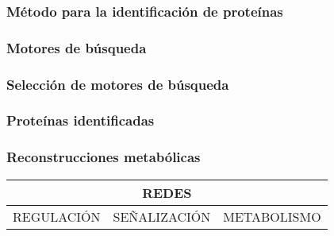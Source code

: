 \documentclass[10pt]{beamer}
\begin{document}
\begin{frame}
\frametitle{Método para la identificación de proteínas}
\end{frame}
\begin{frame}
\frametitle{Motores de búsqueda}
\end{frame}
\begin{frame}
\frametitle{Selección de motores de búsqueda}
\end{frame}
\begin{frame}
\frametitle{Proteínas identificadas}
\end{frame}
\begin{frame}
\frametitle{Reconstrucciones metabólicas}
\begin{center}
\begin{tabular}{|c|c|c|}
\hline
\multicolumn{3}{|c|}{\textbf{REDES}}\\
\hline
\hline
REGULACIÓN&SEÑALIZACIÓN&METABOLISMO\\
\hline
\end{tabular}
\end{center}\end{frame}
\end{document}

